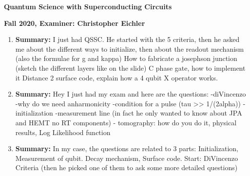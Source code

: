 \documentclass{article}%
\begin{document}
%
\normalsize%
\begin{center}%
\begin{Large}%
\textbf{Quantum Science with Superconducting Circuits}%
\end{Large}%
\linebreak%
\end{center}%
\begin{center}%
\begin{large}%
\textbf{Fall 2020, Examiner: Christopher Eichler}%
\end{large}%
\end{center}%
\begin{enumerate}%
\item%
\begin{mycolorbox}%
\textbf{Summary:}%
\newline%
I just had QSSC. He started with the 5 criteria, then he asked me about the different ways to initialize, then about the readout mechanism (also the formulae for g and kappa) \newline%
How to fabricate a josephson junction (sketch the different layers like on the slide)\newline%
C phase gate, how to implement it\newline%
Distance 2 surface code, explain how a 4 qubit X operator works.%
\end{mycolorbox}%
\item%
\textbf{Summary:}%
\newline%
Hey I just had my exam and here are the questions:\newline%
 {-}diVincenzo\newline%
 {-}why do we need anharmonicity\newline%
 {-}condition for a pulse (tau >> 1/(2alpha))\newline%
 {-}initialization\newline%
 {-}measurement line (in fact he only wanted to know about JPA and HEMT no RT components)\newline%
 {-} tomography: how do you do it, physical results, Log Likelihood function%
\item%
\begin{mycolorbox}%
\textbf{Summary:}%
\newline%
In my case, the questions are related to 3 parts: Initialization, Measurement of qubit. Decay mechanism, Surface code.\newline%
 Start: DiVincenzo Criteria (then he picked one of them to ask some more detailed questions)\newline%

\end{mycolorbox}
\end{enumerate}
\end{document}
